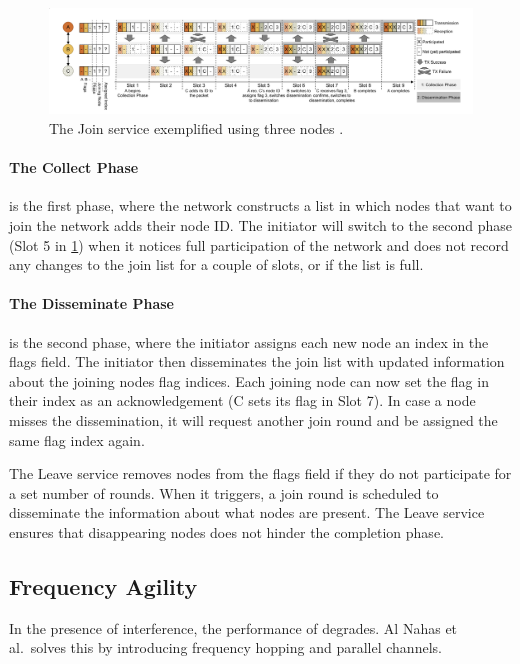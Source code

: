 \begin{figure}[bt]
    \centering
    \includegraphics[width=\textwidth]{figure/JoinServiceOverview.png}
    \caption{The Join service exemplified using three nodes \cite{a2-introduction-paper}.}
    \label{fig:join-service-overview}
\end{figure}

\paragraph*{The Collect Phase} is the first phase, where the network constructs a list in which nodes that want to join the network adds their node ID. The initiator will switch to the second phase (Slot 5 in \cref{fig:join-service-overview}) when it notices full participation of the network and does not record any changes to the join list for a couple of slots, or if the list is full.

\paragraph*{The Disseminate Phase} is the second phase, where the initiator assigns each new node an index in the flags field. The initiator then disseminates the join list with updated information about the joining nodes flag indices. Each joining node can now set the flag in their index as an acknowledgement (C sets its flag in Slot 7). In case a node misses the dissemination, it will request another join round and be assigned the same flag index again.

The Leave service removes nodes from the flags field if they do not participate for a set number of rounds. When it triggers, a join round is scheduled to disseminate the information about what nodes are present. The Leave service ensures that disappearing nodes does not hinder the completion phase.

\subsection{Frequency Agility}
\label{subsec-frequency-agility}
In the presence of interference, the performance of \atwo{} degrades. Al Nahas et al.~solves this by introducing frequency hopping and parallel channels.


